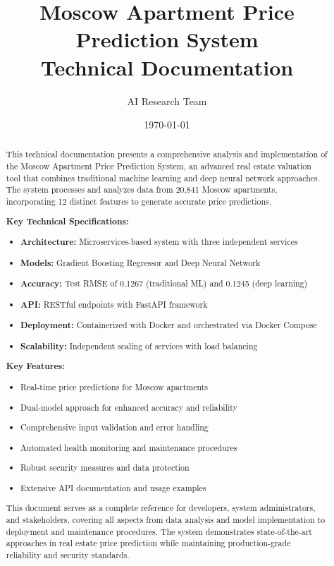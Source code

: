 \documentclass[12pt,a4paper]{report}
\title{Moscow Apartment Price Prediction System\\Technical Documentation}
\author{AI Research Team}
\date{\today}
\begin{document}
\maketitle

\begin{abstract}
\noindent
This technical documentation presents a comprehensive analysis and implementation of the Moscow Apartment Price Prediction System, an advanced real estate valuation tool that combines traditional machine learning and deep neural network approaches. The system processes and analyzes data from 20,841 Moscow apartments, incorporating 12 distinct features to generate accurate price predictions.

\vspace{1em}
\noindent
\textbf{Key Technical Specifications:}
\begin{itemize}
    \item \textbf{Architecture:} Microservices-based system with three independent services
    \item \textbf{Models:} Gradient Boosting Regressor and Deep Neural Network
    \item \textbf{Accuracy:} Test RMSE of 0.1267 (traditional ML) and 0.1245 (deep learning)
    \item \textbf{API:} RESTful endpoints with FastAPI framework
    \item \textbf{Deployment:} Containerized with Docker and orchestrated via Docker Compose
    \item \textbf{Scalability:} Independent scaling of services with load balancing
\end{itemize}

\vspace{1em}
\noindent
\textbf{Key Features:}
\begin{itemize}
    \item Real-time price predictions for Moscow apartments
    \item Dual-model approach for enhanced accuracy and reliability
    \item Comprehensive input validation and error handling
    \item Automated health monitoring and maintenance procedures
    \item Robust security measures and data protection
    \item Extensive API documentation and usage examples
\end{itemize}

\vspace{1em}
\noindent
This document serves as a complete reference for developers, system administrators, and stakeholders, covering all aspects from data analysis and model implementation to deployment and maintenance procedures. The system demonstrates state-of-the-art approaches in real estate price prediction while maintaining production-grade reliability and security standards.
\end{abstract}
\end{document}
